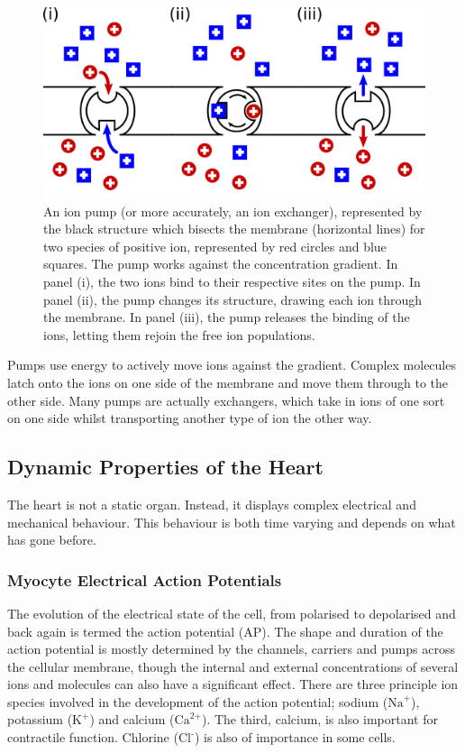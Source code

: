 \begin{figure}
\begin{center}
\includegraphics{figures/intro/ion_pump}
\end{center}
\caption[Ion Pump]{
\label{fig:intro:heart:ion_pump}
An ion pump (or more accurately, an ion exchanger), represented by the black
structure which bisects the membrane (horizontal lines) for two species of
positive ion, represented by red circles and blue squares.
The pump works against the concentration gradient.
In panel (i), the two ions bind to their respective sites on the pump.
In panel (ii), the pump changes its structure, drawing each ion through the
membrane.
In panel (iii), the pump releases the binding of the ions, letting them rejoin
the free ion populations.
}
\end{figure}
Pumps use energy to actively move ions against the gradient.
Complex molecules latch onto the ions on one side of the membrane and move them
through to the other side.
Many pumps are actually exchangers, which take in ions of one sort on one side
whilst transporting another type of ion the other way.

\subsection{Dynamic Properties of the Heart}

The heart is not a static organ.
Instead, it displays complex electrical and mechanical behaviour.
This behaviour is both time varying and depends on what has gone before.


\subsubsection{Myocyte Electrical Action Potentials}

The evolution of the electrical state of the cell, from polarised to depolarised
and back again is termed the action potential (AP).
The shape and duration of
the action potential is mostly determined by the channels, carriers and pumps
across the cellular membrane, though the internal and external concentrations of
several ions and molecules can also have a significant effect.
There are three
principle ion species involved in the development of the action potential;
sodium ($\text{Na}^{\text{+}}$), potassium ($\text{K}^{\text{+}}$) and calcium
($\text{Ca}^{\text{2+}}$).
The third, calcium, is also important for contractile function.
Chlorine ($\text{Cl}^{\text{-}}$) is also of importance in some cells.

